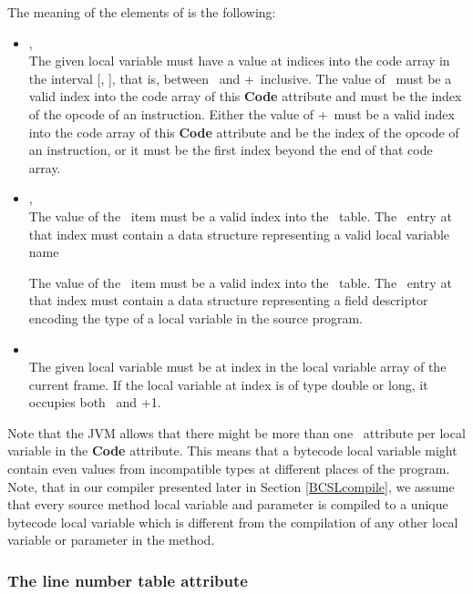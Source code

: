 The meaning of the elements of \locVarEls is the following:
\begin{itemize}

\item \lvElStart, \lvElLen \\ 
    The given local variable must have a value at indices into the code array in the interval [\lvElStart, \lvElLen],
    that is, between \lvElStart \ and  \lvElStart +\lvElLen  \ inclusive. 
    The value of \lvElStart \ must be a valid index into the code array of this \textbf{Code}
    attribute and must be the index of the opcode of an instruction. Either the value of \lvElStart +\lvElLen \  must
     be a valid index into the code array of this \textbf{Code} attribute and be the index of the opcode of an instruction,
    or it must be the first index beyond the end of that code array.

\item \nameInd,\descrInd \\
    The value of the \nameInd \ item must be a valid index into the \constantPool \ table. 
    The \constantPool \ entry at that index must contain a data structure representing a valid local variable name 

    The value of the \descrInd \ item must be a valid index into the \constantPool \ table. 
    The \constantPool \ entry at that index must contain a data structure representing a field descriptor encoding the type of a local variable in the source program.

\item \lvElInd \\
    The given local variable must be at index in the local variable array of the current frame.
    If the local variable at index is of type double or long, it occupies both \lvElInd \ and \lvElInd +1.

\end{itemize}
Note that the JVM allows that  there might be more than one \localVariableTable \ attribute per local variable in the \textbf{Code} attribute.
This means that a bytecode local variable might contain even values from incompatible types at different places of the program.  
Note, that in our compiler presented later in Section \ref{BCSLcompile}, we assume that every source method local variable and parameter is compiled to a unique
bytecode local variable which is different from the compilation of any other local variable or parameter in the method.


\subsubsection{The line number table attribute}\label{lineNumTab}

